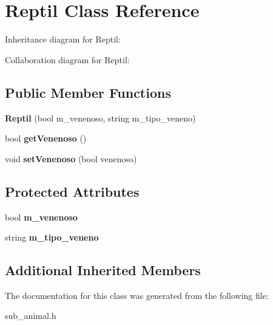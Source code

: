 \hypertarget{classReptil}{}\section{Reptil Class Reference}
\label{classReptil}


Inheritance diagram for Reptil\+:


Collaboration diagram for Reptil\+:
\subsection*{Public Member Functions}
\begin{DoxyCompactItemize}
\item 
\mbox{\label{classReptil_a6b097665e5fb3ffe82c9d6e697282ee4}} 
{\bfseries Reptil} (bool m\+\_\+venenoso, string m\+\_\+tipo\+\_\+veneno)
\item 
\mbox{\label{classReptil_a75138aaa91420a9f82ddd39c19ea8b78}} 
bool {\bfseries get\+Venenoso} ()
\item 
\mbox{\label{classReptil_a9f7ab2a0e2b30040c7c9df48039a266a}} 
void {\bfseries set\+Venenoso} (bool venenoso)
\end{DoxyCompactItemize}
\subsection*{Protected Attributes}
\begin{DoxyCompactItemize}
\item 
\mbox{\label{classReptil_ac195c1dc9a0fa38bc0551034c609c434}} 
bool {\bfseries m\+\_\+venenoso}
\item 
\mbox{\label{classReptil_a6be652c80a0837adc98c0992572272a2}} 
string {\bfseries m\+\_\+tipo\+\_\+veneno}
\end{DoxyCompactItemize}
\subsection*{Additional Inherited Members}


The documentation for this class was generated from the following file\+:\begin{DoxyCompactItemize}
\item 
sub\+\_\+animal.\+h\end{DoxyCompactItemize}
